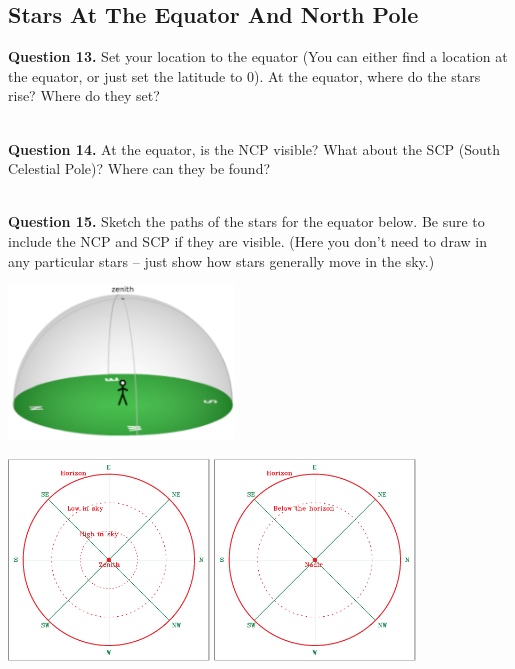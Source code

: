 \documentclass[11pt]{article}
\begin{document}
	\subsection{Stars At The Equator And North Pole}
	
	\textbf{Question 13.} Set your location to the equator (You can either find a location at the equator, or just set the latitude to 0). At the equator, where do the stars rise? Where do they set? \\
	\vspace*{1.2cm}
	
	\hrulefill\\
	
	\textbf{Question 14.} At the equator, is the NCP visible? What about the SCP (South Celestial Pole)? Where can they be found? \\
	\vspace*{1.2cm}
	
	\hrulefill\\
	
	
	\textbf{Question 15.} Sketch the paths of the stars for the equator below. Be sure to include the NCP and SCP if they are visible. (Here you don't need to draw in any particular stars -- just show how stars generally move in the sky.) \\
	\begin{center}
	\includegraphics[width=0.45\textwidth]{local_sky}
	
	\includegraphics[width=0.4\textwidth]{topsky-crop.pdf}
	\includegraphics[width=0.4\textwidth]{botsky-crop.pdf}
\end{center}
\end{document}
